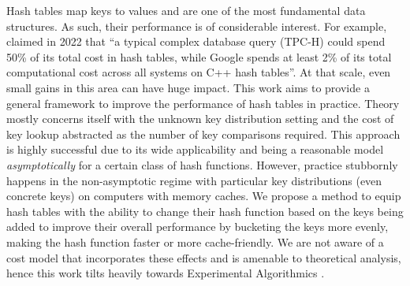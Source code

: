 \documentclass[sigconf]{acmart}
\begin{document}
Hash tables \citep{luhn1953new,enwiki:1207615479} map keys to values and are one of the most fundamental data structures.
As such, their performance is of considerable interest.
For example,  claimed in 2022 that ``a typical complex database query (TPC-H) could spend 50\% of its total cost in hash tables, while Google spends at least 2\% of its total computational cost across all systems on C++ hash tables''.
At that scale, even small gains in this area can have huge impact.
This work aims to provide a general framework to improve the performance of hash tables in practice.
Theory mostly concerns itself with the unknown key distribution setting and the cost of key lookup abstracted as the number of key comparisons required.
This approach is highly successful due to its wide applicability and being a reasonable model \emph{asymptotically} for a certain class of hash functions.
However, practice stubbornly happens in the non-asymptotic regime with particular key distributions (even concrete keys) on computers with memory caches.
We propose a method to equip hash tables with the ability to change their hash function based on the keys being added to improve their overall performance by bucketing the keys more evenly, making the hash function faster or more cache-friendly.
We are not aware of a cost model that incorporates these effects and is amenable to theoretical analysis, hence this work tilts heavily towards Experimental Algorithmics \citep{moret1999towards}.
\end{document}
